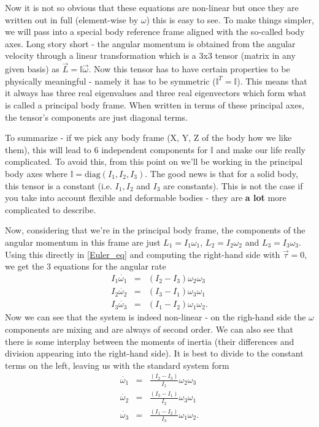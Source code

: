 \documentclass[a4paper]{article}
\begin{document}
	Now it is not so obvious that these equations are non-linear but once they are written out in full (element-wise by $\omega$) this is easy to see.
	To make things simpler, we will pass into a special body reference frame aligned with the so-called body axes.
	Long story short - the angular momentum is obtained from the angular velocity through a linear transformation which is a 3x3 tensor (matrix in any given basis) as $\vec{L} = \mathbb{I}\vec{\omega}$.
	Now this tensor has to have certain properties to be physically meaningful - namely it has to be symmetric ($\mathbb{I}^T = \mathbb{I}$).
	This means that it always has three real eigenvalues and three real eigenvectors which form what is called a principal body frame.
	When written in terms of these principal axes, the tensor's components are just diagonal terms.

	To summarize - if we pick any body frame (X, Y, Z of the body how we like them), this will lead to 6 independent components for $\mathbb{I}$ and make our life really complicated.
	To avoid this, from this point on we'll be working in the principal body axes where $\mathbb{I} = \mathrm{diag}( I_1 , I_2 , I_3 )$.
	The good news is that for a solid body, this tensor is a constant (i.e. $I_1, I_2$ and $I_3$ are constants).
	This is not the case if you take into account flexible and deformable bodies - they are \textbf{a lot} more complicated to describe.

	Now, considering that we're in the principal body frame, the components of the angular momentum in this frame are just $L_1 = I_1 \omega_1$, $L_2 = I_2 \omega_2$ and $L_3 = I_3 \omega_3$.
	Using this directly in \eqref{Euler_eq} and computing the right-hand side with $\vec{\tau} = 0$, we get the 3 equations for the angular rate
	\begin{eqnarray}
		I_1\dot{\omega_1} & = & ( I_2 - I_3 )\omega_2 \omega_3 \nonumber \\
		I_2\dot{\omega_2} & = & ( I_3 - I_1 )\omega_3 \omega_1 \\
		I_3\dot{\omega_3} & = & ( I_1 - I_2 )\omega_1 \omega_2. \nonumber
	\end{eqnarray} 
	Now we can see that the system is indeed non-linear - on the righ-hand side the $\omega$ components are mixing and are always of second order.
	We can also see that there is some interplay between the moments of inertia (their differences and division appearing into the right-hand side).
	It is best to divide to the constant terms on the left, leaving us with the standard system form 
	\begin{eqnarray}
		\dot{\omega_1} & = & \frac{( I_2 - I_3 )}{I_1}\omega_2 \omega_3 \nonumber \\
		\dot{\omega_2} & = & \frac{( I_3 - I_1 )}{I_2}\omega_3 \omega_1 \\
		\dot{\omega_3} & = & \frac{( I_1 - I_2 )}{I_3}\omega_1 \omega_2. \nonumber
	\end{eqnarray}
\end{document}
